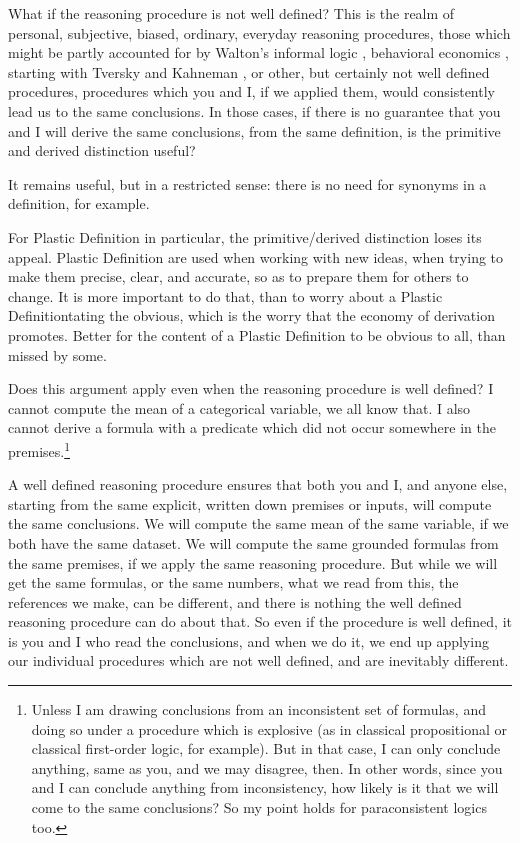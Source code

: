 \documentclass[graybox,envcountchap,sectrefs]{svmono}
\newcommand{\newdef}[1]{Plastic Definition}
\begin{document}
What if the reasoning procedure is not well defined? This is the realm of personal, subjective, biased, ordinary, everyday reasoning procedures, those which might be partly accounted for by Walton's informal logic \cite{walton1989informal},  behavioral economics \cite{mullainathan2000behavioral}, starting with Tversky and Kahneman \cite{kahneman2013prospect}, or other, but certainly not well defined procedures, procedures which you and I, if we applied them, would consistently lead us to the same conclusions. In those cases, if there is no guarantee that you and I will derive the same conclusions, from the same definition, is the primitive and derived distinction useful?

It remains useful, but in a restricted sense: there is no need for synonyms in a definition, for example.

For \newdef s in particular, the primitive/derived distinction loses its appeal. \newdef s are used when working with new ideas, when trying to make them precise, clear, and accurate, so as to prepare them for others to change. It is more important to do that, than to worry about a \newdef stating the obvious, which is the worry that the economy of derivation promotes. Better for the content of a \newdef{} to be obvious to all, than missed by some. 

Does this argument apply even when the reasoning procedure is well defined? I cannot compute the mean of a categorical variable, we all know that. I also cannot derive a formula with a predicate which did not occur somewhere in the premises.\footnote{Unless I am drawing conclusions from an inconsistent set of formulas, and doing so under a procedure which is explosive (as in classical propositional or classical first-order logic, for example). But in that case, I can only conclude anything, same as you, and we may disagree, then. In other words, since you and I can conclude anything from inconsistency, how likely is it that we will come to the same conclusions? So my point holds for paraconsistent logics too.} 

A well defined reasoning procedure ensures that both you and I, and anyone else, starting from the same explicit, written down premises or inputs, will compute the same conclusions. We will compute the same mean of the same variable, if we both have the same dataset. We will compute the same grounded formulas from the same premises, if we apply the same reasoning procedure. But while we will get the same formulas, or the same numbers, what we read from this, the references we make, can be different, and there is nothing the well defined reasoning procedure can do about that. So even if the procedure is well defined, it is you and I who read the conclusions, and when we do it, we end up applying our individual procedures which are not well defined, and are inevitably different.
\end{document}
